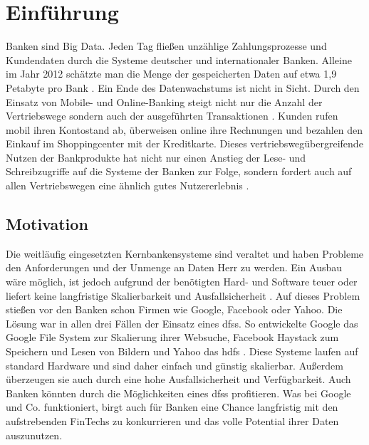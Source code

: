 \documentclass[12pt,oneside,a4paper,parskip]{scrbook}
\begin{document}
\tableofcontents										



\mainmatter


\chapter{Einführung}\label{ch:intro}
Banken sind Big Data. Jeden Tag fließen unzählige Zahlungsprozesse und Kundendaten durch die Systeme deutscher und internationaler Banken. Alleine im Jahr 2012 schätzte man die Menge der gespeicherten Daten auf etwa 1,9 Petabyte pro Bank \cite{datanami}. Ein Ende des Datenwachstums ist nicht in Sicht. Durch den Einsatz von Mobile- und Online-Banking steigt nicht nur die Anzahl der Vertriebswege sondern auch der ausgeführten Transaktionen \cite{DBBigData}. Kunden rufen mobil ihren Kontostand ab, überweisen online ihre Rechnungen und bezahlen den Einkauf im Shoppingcenter mit der Kreditkarte. Dieses vertriebswegübergreifende Nutzen der Bankprodukte hat nicht nur einen Anstieg der Lese- und Schreibzugriffe auf die Systeme der Banken zur Folge, sondern fordert auch auf allen Vertriebswegen eine ähnlich gutes Nutzererlebnis \cite{bankwirtschaft}.

\section{Motivation}
Die weitläufig eingesetzten Kernbankensysteme sind veraltet und haben Probleme den Anforderungen und der Unmenge an Daten Herr zu werden. Ein Ausbau wäre möglich, ist jedoch aufgrund der benötigten Hard- und Software teuer oder liefert keine langfristige Skalierbarkeit und Ausfallsicherheit \cite{herzKernbankensystem}. Auf dieses Problem stießen vor den Banken schon Firmen wie Google, Facebook oder Yahoo. Die Lösung war in allen drei Fällen der Einsatz eines \acp{dfs}. So entwickelte Google das Google File System \cite{GFS} zur Skalierung ihrer Websuche, Facebook Haystack \cite{haystack} zum Speichern und Lesen von Bildern und Yahoo das \ac{hdfs} \cite{hdfs}. Diese Systeme laufen auf standard Hardware und sind daher einfach und günstig skalierbar. Außerdem überzeugen sie auch durch eine hohe Ausfallsicherheit und Verfügbarkeit. Auch Banken könnten durch die Möglichkeiten eines \acp{dfs} profitieren. Was bei Google und Co. funktioniert, birgt auch für Banken eine Chance langfristig mit den aufstrebenden FinTechs zu konkurrieren und das volle Potential ihrer Daten auszunutzen\cite{wiki:fintech}.
\end{document}
